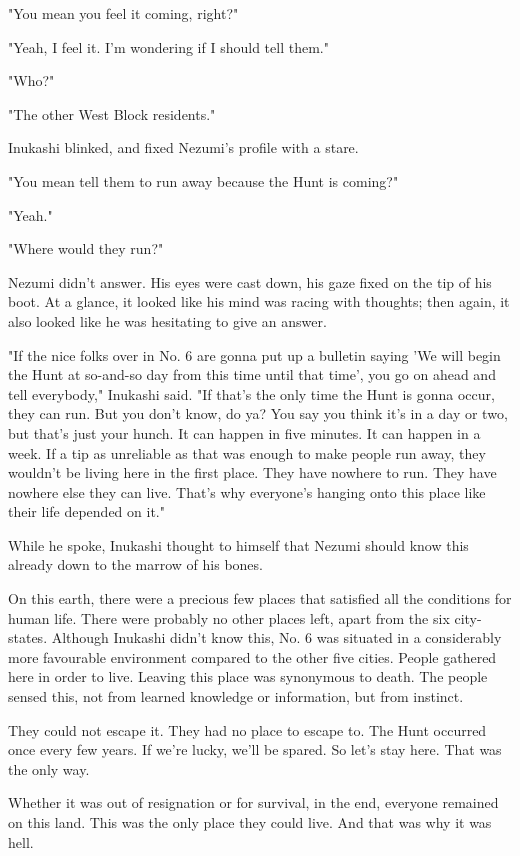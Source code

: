 "You mean you feel it coming, right?"

"Yeah, I feel it. I'm wondering if I should tell them."

"Who?"

"The other West Block residents."

Inukashi blinked, and fixed Nezumi's profile with a stare.

"You mean tell them to run away because the Hunt is coming?"

"Yeah."

"Where would they run?"

Nezumi didn't answer. His eyes were cast down, his gaze fixed on the tip
of his boot. At a glance, it looked like his mind was racing with
thoughts; then again, it also looked like he was hesitating to give an
answer.

"If the nice folks over in No. 6 are gonna put up a bulletin saying 'We
will begin the Hunt at so-and-so day from this time until that time',
you go on ahead and tell everybody," Inukashi said. "If that's the only
time the Hunt is gonna occur, they can run. But you don't know, do ya?
You say you think it's in a day or two, but that's just your hunch. It
can happen in five minutes. It can happen in a week. If a tip as
unreliable as that was enough to make people run away, they wouldn't be
living here in the first place. They have nowhere to run. They have
nowhere else they can live. That's why everyone's hanging onto this
place like their life depended on it."

While he spoke, Inukashi thought to himself that Nezumi should know this
already down to the marrow of his bones.

On this earth, there were a precious few places that satisfied all the
conditions for human life. There were probably no other places left,
apart from the six city-states. Although Inukashi didn't know this, No.
6 was situated in a considerably more favourable environment compared to
the other five cities. People gathered here in order to live. Leaving
this place was synonymous to death. The people sensed this, not from
learned knowledge or information, but from instinct.

They could not escape it. They had no place to escape to. The Hunt
occurred once every few years. If we're lucky, we'll be spared. So let's
stay here. That was the only way.

Whether it was out of resignation or for survival, in the end, everyone
remained on this land. This was the only place they could live. And that
was why it was hell.

